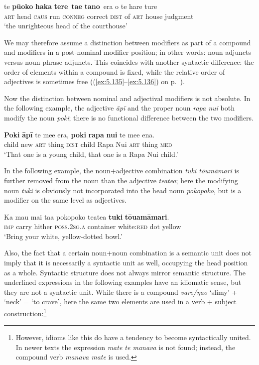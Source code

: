 \ea\label{ex:5.107}
\gll te {\ob}\textbf{pū{\ꞌ}oko} \textbf{haka} \textbf{tere}\,{\cb} {\ob}\textbf{ta{\ꞌ}e} \textbf{tano}\,{\cb} era o te hare ture \\
\textsc{art} {\db}head \textsc{caus} run {\db}\textsc{conneg} correct \textsc{dist} of \textsc{art} house judgment \\

\glt
‘the unrighteous head of the courthouse’ \textstyleExampleref{[Luke 18:6]}
\z

We may therefore assume a distinction between modifiers as part of a compound and modifiers in a post-nominal modifier position; in other words: noun adjuncts versus noun phrase adjuncts. This coincides with another syntactic difference: the order of elements within a compound is fixed, while the relative order of adjectives is sometimes free ((\ref{ex:5.135}–\ref{ex:5.136}) on p.~\pageref{ex:5.135}).

Now the distinction between nominal and adjectival modifiers is not absolute. In the following example, the adjective \textit{{\ꞌ}āpī} and the proper noun \textit{rapa nui} both modify the noun \textit{poki}; there is no functional difference between the two modifiers.

\ea\label{ex:5.108}
\gll \textbf{Poki} \textbf{{\ꞌ}āpī} te me{\ꞌ}e era, \textbf{poki} \textbf{rapa} \textbf{nui} te me{\ꞌ}e ena. \\
child new \textsc{art} thing \textsc{dist} child Rapa Nui \textsc{art} thing \textsc{med} \\

\glt
‘That one is a young child, that one is a Rapa Nui child.’ \textstyleExampleref{[R416.238]} 
\z

In the following example, the noun+adjective combination \textit{tuki tōumāmari} is further removed from the noun than the adjective \textit{teatea}; here the modifying noun \textit{tuki} is obviously not incorporated into the head noun \textit{pokopoko}, but is a modifier on the same level as adjectives.

\ea\label{ex:5.109}
\gll Ka ma{\ꞌ}u mai ta{\ꞌ}a pokopoko teatea \textbf{tuki} \textbf{tōuamāmari}. \\
\textsc{imp} carry hither \textsc{poss.2sg.a} container white:\textsc{red} dot yellow \\

\glt
‘Bring your white, yellow-dotted bowl.’ \textstyleExampleref{[Notes]}
\z

Also, the fact that a certain noun+noun combination is a semantic unit does not imply that it is necessarily a syntactic unit as well, occupying the head position as a whole. Syntactic structure does not always mirror semantic structure. The underlined expressions in the following examples have an idiomatic sense, but they are not a syntactic unit. While there is a compound \textit{vare/ŋao} ‘slimy’ + ‘neck’ = ‘to crave’, here the same two elements are used in a verb + subject construction:\footnote{\label{fn:266}However, idioms like this do have a tendency to become syntactically united. In newer texts the expression \textit{mate te manava} is not found; instead, the compound verb \textit{manava mate} is used.}


